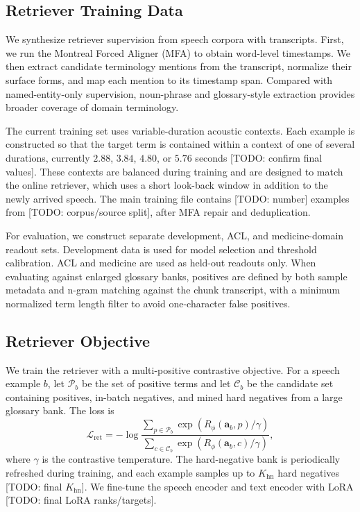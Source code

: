 \subsection{Retriever Training Data}
\label{sec:retriever_data}

We synthesize retriever supervision from speech corpora with transcripts.  First, we run the Montreal Forced Aligner (MFA) to obtain word-level timestamps.  We then extract candidate terminology mentions from the transcript, normalize their surface forms, and map each mention to its timestamp span.  Compared with named-entity-only supervision, noun-phrase and glossary-style extraction provides broader coverage of domain terminology.

The current training set uses variable-duration acoustic contexts.  Each example is constructed so that the target term is contained within a context of one of several durations, currently $2.88$, $3.84$, $4.80$, or $5.76$ seconds [TODO: confirm final values].  These contexts are balanced during training and are designed to match the online retriever, which uses a short look-back window in addition to the newly arrived speech.  The main training file contains [TODO: number] examples from [TODO: corpus/source split], after MFA repair and deduplication.

For evaluation, we construct separate development, ACL, and medicine-domain readout sets.  Development data is used for model selection and threshold calibration.  ACL and medicine are used as held-out readouts only.  When evaluating against enlarged glossary banks, positives are defined by both sample metadata and n-gram matching against the chunk transcript, with a minimum normalized term length filter to avoid one-character false positives.

\subsection{Retriever Objective}
\label{sec:retriever_training}

We train the retriever with a multi-positive contrastive objective.  For a speech example $b$, let $\mathcal{P}_b$ be the set of positive terms and let $\mathcal{C}_b$ be the candidate set containing positives, in-batch negatives, and mined hard negatives from a large glossary bank.  The loss is
\begin{equation}
  \mathcal{L}_{\mathrm{ret}}
  =
  -\log
  \frac{
    \sum_{p\in\mathcal{P}_b}
    \exp(R_\phi(\mathbf{a}_b,p)/\gamma)
  }{
    \sum_{c\in\mathcal{C}_b}
    \exp(R_\phi(\mathbf{a}_b,c)/\gamma)
  },
\end{equation}
where $\gamma$ is the contrastive temperature.  The hard-negative bank is periodically refreshed during training, and each example samples up to $K_{\mathrm{hn}}$ hard negatives [TODO: final $K_{\mathrm{hn}}$].  We fine-tune the speech encoder and text encoder with LoRA [TODO: final LoRA ranks/targets].

